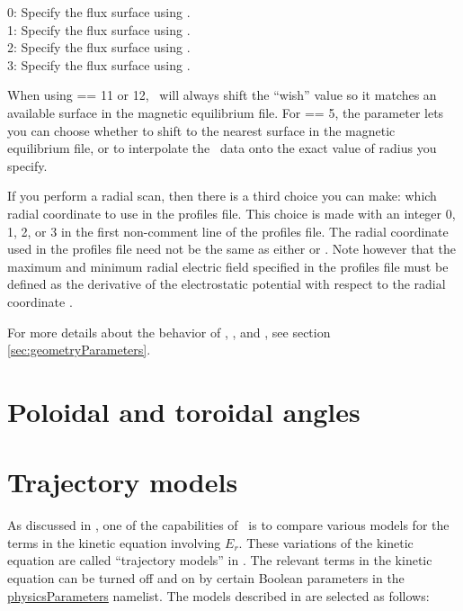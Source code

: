 {\setlength{\parindent}{0cm}

0: Specify the flux surface using .\\

1: Specify the flux surface using .\\

2: Specify the flux surface using .\\

3: Specify the flux surface using .\\

}

When using  == 11 or 12, \sfincs~will always shift the ``wish'' value so it matches an available surface in the magnetic equilibrium file.
For  == 5, the  parameter lets you can choose whether to shift to the nearest surface in the magnetic equilibrium file,
or to interpolate the \vmec~data onto the exact value of radius you specify.

If you perform a radial scan, then there is a third choice you can make: which radial coordinate to use in the {\ttfamily profiles} file.
This choice is made with an integer 0, 1, 2, or 3 in the first non-comment line of the {\ttfamily profiles} file.
The radial coordinate used in the {\ttfamily profiles} file need not be the same as either
 or .
Note however that the maximum and minimum radial electric field specified in the {\ttfamily profiles}
file must be defined as the derivative of the electrostatic potential with respect to the radial coordinate .

For more details about the behavior of , , and ,
see section \ref{sec:geometryParameters}.

\section{Poloidal and toroidal angles}



\section{Trajectory models}

As discussed in \cite{sfincsPaper},
one of the capabilities of \sfincs~is to compare various models for the terms in the kinetic equation involving $E_r$.
These variations of the kinetic equation are called ``trajectory models'' in \cite{sfincsPaper}.
The relevant terms in the kinetic equation can be turned off and on by certain Boolean parameters in the {\ttfamily \hyperref[sec:physicsParameters]{physicsParameters}} namelist.
The models described in \cite{sfincsPaper} are selected as follows:\\


